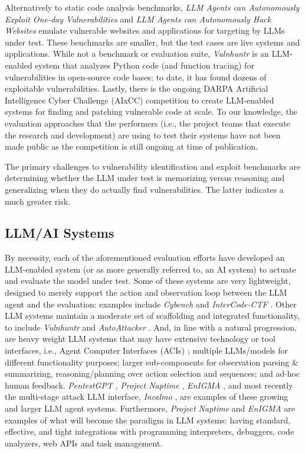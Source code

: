 Alternatively to static code analysis benchmarks, \textit{LLM Agents can Autonomously Exploit One-day Vulnerabilities} \cite{fang2024llm_od} and \textit{LLM Agents can Autonomously Hack Websites} \cite{fang2024llm}  emulate vulnerable websites and applications for targeting by LLMs under test. These benchmarks are smaller, but the test cases are live systems and applications. While not a benchmark or evaluation suite, \textit{Vulnhuntr} \cite{vulnhuntr} is an LLM-enabled system that analyzes Python code (and function tracing) for vulnerabilities in open-source code bases; to date, it has found dozens of exploitable vulnerabilities. Lastly, there is the ongoing DARPA Artificial Intelligence Cyber Challenge (AIxCC) \cite{aixcc} competition to create LLM-enabled systems for finding and patching vulnerable code at scale. To our knowledge, the evaluation approaches that the performers (i.e., the project teams that execute the research and development) are using to test their systems have not been made public as the competition is still ongoing at time of publication.


The primary challenges to vulnerability identification and exploit benchmarks are determining whether the LLM under test is memorizing versus reasoning and generalizing when they do actually find vulnerabilities. The latter indicates a much greater risk.


\subsection{LLM/AI Systems} 

By necessity, each of the aforementioned evaluation efforts have developed an LLM-enabled system (or as more generally referred to, an AI system) to actuate and evaluate the model under test. Some of these systems are very lightweight, designed to merely support the action and observation loop between the LLM agent and the evaluation: examples include \textit{Cybench}\cite{zhang2024cybenchframeworkevaluatingcybersecurity} and \textit{InterCode-CTF} \cite{yang2023language}. Other LLM systems maintain a moderate set of scaffolding and integrated functionality, to include \textit{Vulnhuntr} \cite{vulnhuntr} and \textit{AutoAttacker} \cite{xu2024autoattacker}. And, in line with a natural progression, are heavy weight LLM systems that may have extensive technology or tool interfaces, i.e., Agent Computer Interfaces (ACIs) \cite{yang2024swe}; multiple LLMs/models for different functionality purposes; larger sub-components for observation parsing \& summarizing, reasoning/planning over action selection and sequences; and ad-hoc human feedback. \textit{PentestGPT} \cite{deng2023pentestgpt}, \textit{Project Naptime} \cite{glazunov2024project}, \textit{EnIGMA} \cite{abramovich2024enigma}, and most recently the multi-stage attack LLM interface, \textit{Incalmo} \cite{incalmo}, are examples of these growing and larger LLM agent systems. Furthermore, \textit{Project Naptime} \cite{glazunov2024project} and \textit{EnIGMA} \cite{abramovich2024enigma} are examples of what will become the paradigm in LLM systems: having standard, effective, and tight integrations with programming interpreters, debuggers, code analyzers, web APIs and task management.


